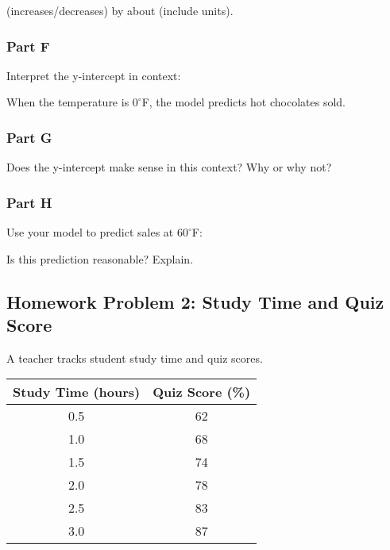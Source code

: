 \documentclass[12pt]{article}
\begin{document}
\begin{itemize}
				\underline{\hspace{2in}} (increases/decreases) by about \underline{\hspace{1.4in}} (include units).

			\subsubsection*{Part F}
			
				Interpret the y-intercept in context:

				When the temperature is $0^\circ$F, the model predicts \underline{\hspace{1in}} hot chocolates sold.

			\subsubsection*{Part G}
			
				Does the y-intercept make sense in this context? Why or why not?

				\vspace{3cm}

			\subsubsection*{Part H}
			
				Use your model to predict sales at $60^\circ$F:

				\vspace{2cm}

				Is this prediction reasonable? Explain.

				\vspace{2cm}

				\newpage

		\subsection*{Homework Problem 2: Study Time and Quiz Score}

			A teacher tracks student study time and quiz scores.

			\begin{center}
				\begin{tabular}{|c|c|}
					\hline
					Study Time (hours) & Quiz Score (\%) \\
					\hline
					0.5 & 62 \\
					1.0 & 68 \\
					1.5 & 74 \\
					2.0 & 78 \\
					2.5 & 83 \\
					3.0 & 87 \\
					\hline
				\end{tabular}
			\end{center}


\end{itemize}
\end{document}
